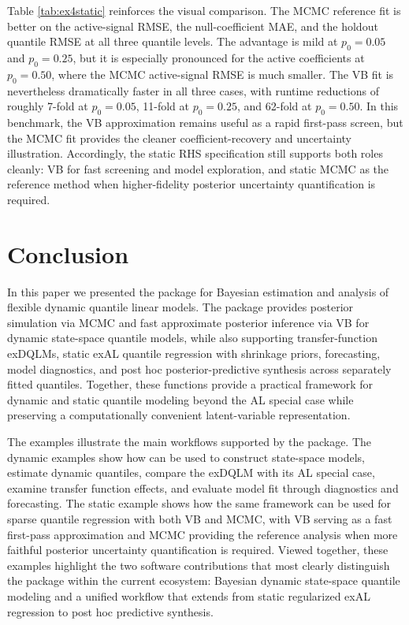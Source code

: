 \documentclass[jss]{jss}
\begin{document}
Table \ref{tab:ex4static} reinforces the visual comparison. The MCMC reference fit is better on the active-signal RMSE, the null-coefficient MAE, and the holdout quantile RMSE at all three quantile levels. The advantage is mild at \(p_0 = 0.05\) and \(p_0 = 0.25\), but it is especially pronounced for the active coefficients at \(p_0 = 0.50\), where the MCMC active-signal RMSE is much smaller. The VB fit is nevertheless dramatically faster in all three cases, with runtime reductions of roughly 7-fold at \(p_0 = 0.05\), 11-fold at \(p_0 = 0.25\), and 62-fold at \(p_0 = 0.50\). In this benchmark, the VB approximation remains useful as a rapid first-pass screen, but the MCMC fit provides the cleaner coefficient-recovery and uncertainty illustration. Accordingly, the static RHS specification still supports both roles cleanly: VB for fast screening and model exploration, and static MCMC as the reference method when higher-fidelity posterior uncertainty quantification is required.

\section{Conclusion}
\label{sec:summary}

In this paper we presented the  package  for Bayesian estimation and analysis of flexible dynamic quantile linear models. The package provides posterior simulation via MCMC and fast approximate posterior inference via VB for dynamic state-space quantile models, while also supporting transfer-function exDQLMs, static exAL quantile regression with shrinkage priors, forecasting, model diagnostics, and post hoc posterior-predictive synthesis across separately fitted quantiles. Together, these functions provide a practical framework for dynamic and static quantile modeling beyond the AL special case while preserving a computationally convenient latent-variable representation.

The examples illustrate the main workflows supported by the package. The dynamic examples show how  can be used to construct state-space models, estimate dynamic quantiles, compare the exDQLM with its AL special case, examine transfer function effects, and evaluate model fit through diagnostics and forecasting. The static example shows how the same framework can be used for sparse quantile regression with both VB and MCMC, with VB serving as a fast first-pass approximation and MCMC providing the reference analysis when more faithful posterior uncertainty quantification is required. Viewed together, these examples highlight the two software contributions that most clearly distinguish the package within the current ecosystem: Bayesian dynamic state-space quantile modeling and a unified workflow that extends from static regularized exAL regression to post hoc predictive synthesis.
\end{document}
